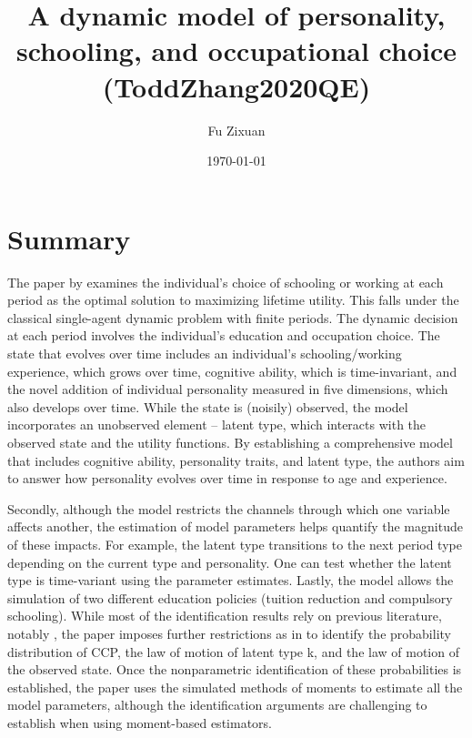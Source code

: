 \documentclass[10pt]{article}
\title{A dynamic model of personality, schooling, and occupational choice (ToddZhang2020QE)}
\author{Fu Zixuan}
\date{\today}
\begin{document}
\maketitle




\section{Summary}
The paper by \citet{todd2020dynamic} examines the individual's choice of
schooling or working at each period as the optimal solution to maximizing
lifetime utility. This falls under the classical single-agent dynamic problem
with finite periods. The dynamic decision at each period involves the
individual's education and occupation choice. The state that evolves over time
includes an individual's schooling/working experience, which grows over time,
cognitive ability, which is time-invariant, and the novel addition of
individual personality measured in five dimensions, which also develops over
time. While the state is (noisily) observed, the model incorporates an
unobserved element -- latent type, which interacts with the observed state and
the utility functions. By establishing a comprehensive model that includes
cognitive ability, personality traits, and latent type, the authors aim to
answer how personality evolves over time in response to age and experience.

Secondly, although the model restricts the channels through which one variable
affects another, the estimation of model parameters helps quantify the
magnitude of these impacts. For example, the latent type transitions to the
next period type depending on the current type and personality. One can test
whether the latent type is time-variant using the parameter estimates. Lastly,
the model allows the simulation of two different education policies (tuition
reduction and compulsory schooling). While most of the identification results
rely on previous literature, notably \cite{hu2012nonparametric}, the paper
imposes further restrictions as in \citet{hu2017simple} to identify the
probability distribution of CCP, the law of motion of latent type k, and the
law of motion of the observed state. Once the nonparametric identification of
these probabilities is established, the paper uses the simulated methods of
moments to estimate all the model parameters, although the identification
arguments are challenging to establish when using moment-based estimators.
\end{document}
